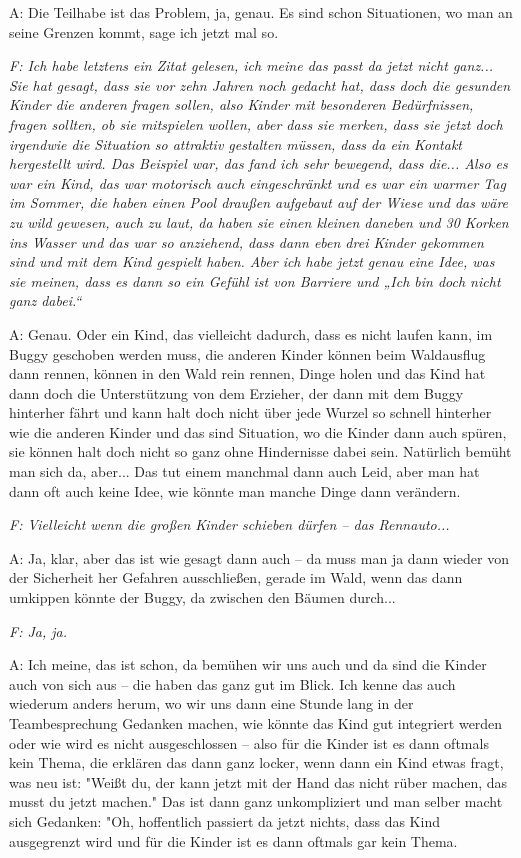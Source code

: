 \begin{linenumbers*}
A: Die Teilhabe ist das Problem, ja, genau. Es sind schon Situationen, wo man an seine Grenzen kommt, sage ich jetzt mal so.

\emph{F: Ich habe letztens ein Zitat gelesen, ich meine das passt da jetzt nicht ganz... Sie hat gesagt, dass sie vor zehn Jahren noch gedacht hat, dass doch die gesunden Kinder die anderen fragen sollen, also Kinder mit besonderen Bedürfnissen, fragen sollten, ob sie mitspielen wollen, aber dass sie merken, dass sie jetzt doch irgendwie die Situation so attraktiv gestalten müssen, dass da ein Kontakt hergestellt wird. Das Beispiel war, das fand ich sehr bewegend, dass die... Also es war ein Kind, das war motorisch auch eingeschränkt und es war ein warmer Tag im Sommer, die haben einen Pool draußen aufgebaut auf der Wiese und das wäre zu wild gewesen, auch zu laut, da haben sie einen kleinen daneben und 30 Korken ins Wasser und das war so anziehend, dass dann eben drei Kinder gekommen sind und mit dem Kind gespielt haben. Aber ich habe jetzt genau eine Idee, was sie meinen, dass es dann so ein Gefühl ist von Barriere und „Ich bin doch nicht ganz dabei.“} 

A: Genau. Oder ein Kind, das vielleicht dadurch, dass es nicht laufen kann, im Buggy geschoben werden muss, die anderen Kinder können beim Waldausflug dann rennen, können in den Wald rein rennen, Dinge holen und das Kind hat dann doch die Unterstützung von dem Erzieher, der dann mit dem Buggy hinterher fährt und kann halt doch nicht über jede Wurzel so schnell hinterher wie die anderen Kinder und das sind Situation, wo die Kinder dann auch spüren, sie können halt doch nicht so ganz ohne Hindernisse dabei sein. Natürlich bemüht man sich da, aber... Das tut einem manchmal dann auch Leid, aber man hat dann oft auch keine Idee, wie könnte man manche Dinge dann verändern.

\emph{F: Vielleicht wenn die großen Kinder schieben dürfen -- das Rennauto...}

A: Ja, klar, aber das ist wie gesagt dann auch -- da muss man ja dann wieder von der Sicherheit her Gefahren ausschließen, gerade im Wald, wenn das dann umkippen könnte der Buggy, da zwischen den Bäumen durch...

\emph{F: Ja, ja.}

A: Ich meine, das ist schon, da bemühen wir uns auch und da sind die Kinder auch von sich aus -- die haben das ganz gut im Blick. 
Ich kenne das auch wiederum anders herum, wo wir uns dann eine Stunde lang in der Teambesprechung Gedanken machen, wie könnte das Kind gut integriert werden oder wie wird es nicht ausgeschlossen -- also für die Kinder ist es dann oftmals kein Thema, die erklären das dann ganz locker, wenn dann ein Kind etwas fragt, was neu ist: "Weißt du, der kann jetzt mit der Hand das nicht rüber machen, das musst du jetzt machen." Das ist dann ganz unkompliziert und man selber macht sich Gedanken: "Oh, hoffentlich passiert da jetzt nichts, dass das Kind ausgegrenzt wird und für die Kinder ist es dann oftmals gar kein Thema. 


\end{linenumbers*}
